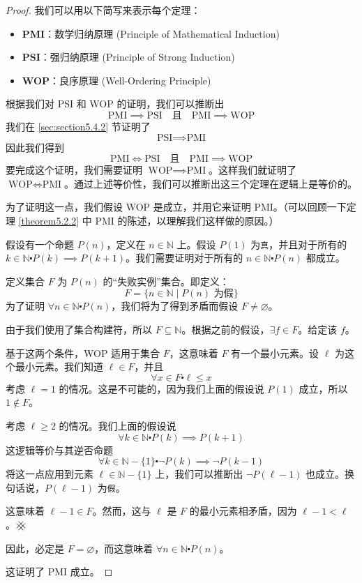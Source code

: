 \begin{proof}
    我们可以用以下简写来表示每个定理：
    \begin{itemize}
        \item \textbf{PMI}：数学归纳原理 (Principle of Mathematical Induction)
        \item \textbf{PSI}：强归纳原理 (Principle of Strong Induction)
        \item \textbf{WOP}：良序原理 (Well-Ordering Principle)
    \end{itemize}
    根据我们对 PSI 和 WOP 的证明，我们可以推断出
    \[\text{PMI} \implies \text{PSI} \quad\text{且}\quad \text{PMI} \implies \text{WOP}\]
    我们在 \ref{sec:section5.4.2} 节证明了
    \[\text{PSI} \implies \text{PMI}\]
    因此我们得到
    \[\text{PMI} \iff \text{PSI} \quad\text{且}\quad \text{PMI} \implies \text{WOP}\]
    要完成这个证明，我们需要证明 $\text{WOP} \implies \text{PMI}$。这样我们就证明了 $\text{WOP} \iff \text{PMI}$。通过上述等价性，我们可以推断出这三个定理在逻辑上是等价的。

    为了证明这一点，我们假设 WOP 是成立，并用它来证明 PMI。（可以回顾一下定理 \ref{theorem5.2.2} 中 PMI 的陈述，以理解我们这样做的原因。）

    假设有一个命题 $P(n)$，定义在 $n \in \mathbb{N}$ 上。假设 $P(1)$ 为\verb|真|，并且对于所有的 $k \in \mathbb{N} \centerdot P(k) \implies P(k+1)$。我们需要证明对于所有的 $n \in \mathbb{N} \centerdot P(n)$ 都成立。


    定义集合 $F$ 为 $P(n)$ 的``失败实例''集合。即定义：
    \[F = \{n \in \mathbb{N} \mid P(n) \text{ 为假}\}\]
    为了证明 $\forall n \in \mathbb{N} \centerdot P(n)$，我们将为了得到矛盾而假设 $F \ne \varnothing$。

    由于我们使用了集合构建符，所以 $F \subseteq \mathbb{N}$。根据之前的假设，$\exists f \in F$。给定该 $f$。

    基于这两个条件，WOP 适用于集合 $F$，这意味着 $F$ 有一个最小元素。设 $\ell$ 为这个最小元素。我们知道 $\ell \in F$，并且
    \[\forall x \in F \centerdot \ell \le x\]
    考虑 $\ell = 1$ 的情况。这是不可能的，因为我们上面的假设说 $P(1)$ 成立，所以 $1 \notin F$。

    考虑 $\ell \ge 2$ 的情况。我们上面的假设说
    \[\forall k \in \mathbb{N} \centerdot P(k) \implies P(k+1)\]
    这逻辑等价与其逆否命题
    \[\forall k \in \mathbb{N} - \{1\} \centerdot \neg P(k) \implies \neg P(k-1)\]
    将这一点应用到元素 $\ell \in \mathbb{N} - \{1\}$ 上，我们可以推断出 $\neg P(\ell - 1)$ 也成立。换句话说，$P(\ell-1)$ 为\verb|假|。

    这意味着 $\ell-1 \in F$。然而，这与 $\ell$ 是 $F$ 的最小元素相矛盾，因为 $\ell - 1 < \ell$。$\hashx$

    因此，必定是 $F = \varnothing$，而这意味着 $\forall n \in \mathbb{N} \centerdot P(n)$。

    这证明了 PMI 成立。
\end{proof}

